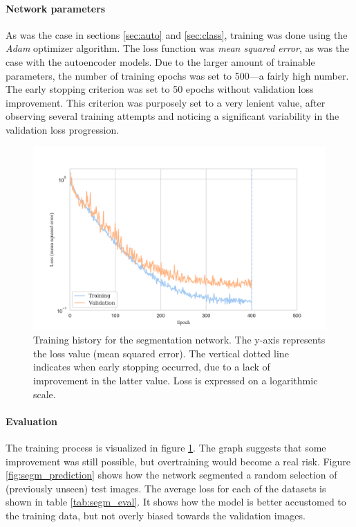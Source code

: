 \paragraph{Network parameters} As was the case in sections \textcolor{blue}{\ref{sec:auto}} and \textcolor{blue}{\ref{sec:class}}, training was done using the \textit{Adam} optimizer algorithm. The loss function was \textit{mean squared error}, as was the case with the autoencoder models. Due to the larger amount of trainable parameters, the number of training epochs was set to 500---a fairly high number. The early stopping criterion was set to 50 epochs without validation loss improvement. This criterion was purposely set to a very lenient value, after observing several training attempts and noticing a significant variability in the validation loss progression.

\begin{figure}[!htbp]
  \begin{center}
    \includegraphics[width=\linewidth, keepaspectratio]{images/segm_history}
    \caption{Training history for the segmentation network. The y-axis represents the loss value (mean squared error). The vertical dotted line indicates when early stopping occurred, due to a lack of improvement in the latter value. Loss is expressed on a logarithmic scale.}
    \label{fig:segm_history}
  \end{center}
\end{figure}

\paragraph{Evaluation} The training process is visualized in figure \textcolor{blue}{\ref{fig:segm_history}}. The graph suggests that some improvement was still possible, but overtraining would become a real risk. Figure \textcolor{blue}{\ref{fig:segm_prediction}} shows how the network segmented a random selection of (previously unseen) test images. The average loss for each of the datasets is shown in table \textcolor{blue}{\ref{tab:segm_eval}}. It shows how the model is better accustomed to the training data, but not overly biased towards the validation images.

